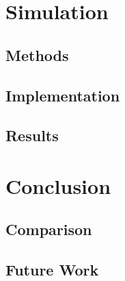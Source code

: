 \newpage

\section{Simulation}

\subsection{Methods}
\subsection{Implementation}
\subsection{Results}

\section{Conclusion}
\subsection{Comparison}
\subsection{Future Work}